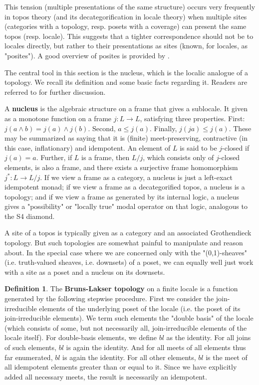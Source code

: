 \documentclass[hoptionsi,review,format=acmsmall]{acmart}
\theoremstyle{definition}
\newtheorem{definition}{Definition}[section]
\begin{document}
This tension (multiple presentations of the same structure) occurs very frequently in topos theory (and its decategorification in locale theory) when multiple sites (categories with a topology, resp. posets with a coverage) can present the same topos (resp. locale). This suggests that a tighter correspondence should not be to locales directly, but rather to their presentations as sites (known, for locales, as "posites"). A good overview of posites is provided by \cite{schultz2017temporal}.

The central tool in this section is the nucleus, which is the localic analogue of a topology. We recall its definition and some basic facts regarding it. Readers are referred to \cite{johnstone1982stone, vickers1996topology} for further discussion.

A \textbf{nucleus} is the algebraic structure on a frame that gives a sublocale. It given as a monotone function on a frame \(j : L \rightarrow L\), satisfying three properties. First: \(j(a \wedge b) = j(a) \wedge j(b)\). Second, \(a \le j(a)\). Finally, \(j(ja) \le j(a)\). These may be summarized as saying that it is (finite) meet-preserving, contractive (in this case, inflationary) and idempotent. An element of \(L\) is said to be \(j\)-closed if \(j(a)=a\). Further, if \(L\) is a frame, then \(L/j\), which consists only of \(j\)-closed elements, is also a frame, and there exists a surjective frame homomorphism \(j^* : L \rightarrow L/j\). If we view a frame as a category, a nucleus is just a left-exact idempotent monad; if we view a frame as a decategorified topos, a nucleus is a topology; and if we view a frame as generated by its internal logic, a nucleus gives a "possibility" or "locally true" modal operator on that logic, analogous to the S4 diamond.

A site of a topos is typically given as a category and an associated Grothendieck topology. But such topologies are somewhat painful to manipulate and reason about. In the special case where we are concerned only with the "(0,1)-sheaves" (i.e. truth-valued sheaves, i.e. downsets) of a poset, we can equally well just work with a site as a poset and a nucleus on its downsets.

\begin{definition}
The \textbf{Bruns-Lakser topology} on a finite locale is a function generated by the following stepwise procedure. First we consider the join-irreducible elements of the underlying poset of the locale (i.e. the poset of its join-irreducible elements). We term such elements the "double basis" of the locale (which consists of some, but not necessarily all, join-irreducible elements of the locale itself). For double-basis elements, we define \(bl\) as the identity. For all joins of such elements, \(bl\) is again the identity. And for all meets of all elements thus far enumerated, \(bl\) is again the identity. For all other elements, \(bl\) is the meet of all idempotent elements greater than or equal to it. Since we have explicitly added all necessary meets, the result is necessarily an idempotent.
\end{definition}
\end{document}

